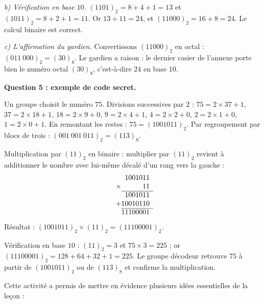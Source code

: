 \documentclass[11pt]{article}
\newcounter{popsec}
\newcounter{popsub}
\newcommand{\courssub}[1]{%
  \stepcounter{popsub}%
  \par\vspace{9pt}\noindent{\popxbold\fontsize{11.5}{13}\selectfont\color{popink}{\color{poporange}\thepopsec.\thepopsub}\hspace{6pt}#1}\par\nopagebreak\vspace{4pt}
}
\begin{document}
\begin{exoresolu}
\emph{b) Vérification en base $10$.} $(1101)_2 = 8 + 4 + 1 = 13$ et $(1011)_2 = 8 + 2 + 1 = 11$. Or $13 + 11 = 24$, et $(11000)_2 = 16 + 8 = 24$. Le calcul binaire est correct.

\emph{c) L'affirmation du gardien.} Convertissons $(11000)_2$ en octal : $(011\ 000)_2 = (30)_8$. Le gardien a raison : le dernier casier de l'annexe porte bien le numéro octal $(30)_8$, c'est-à-dire $24$ en base $10$.

\textbf{Question 5 : exemple de code secret.}

Un groupe choisit le numéro $75$. Divisions successives par $2$ :
$75 = 2 \times 37 + 1$,
$37 = 2 \times 18 + 1$,
$18 = 2 \times 9 + 0$,
$9 = 2 \times 4 + 1$,
$4 = 2 \times 2 + 0$,
$2 = 2 \times 1 + 0$,
$1 = 2 \times 0 + 1$.
En remontant les restes : $75 = (1001011)_2$.
Par regroupement par blocs de trois : $(001\ 001\ 011)_2 = (113)_8$.

Multiplication par $(11)_2$ en binaire : multiplier par $(11)_2$ revient à additionner le nombre avec lui-même décalé d'un rang vers la gauche :
\[
\begin{array}{r@{}c@{}c@{}c@{}c@{}c@{}c@{}c@{}c@{}c}
& & & 1 & 0 & 0 & 1 & 0 & 1 & 1 \\
\times & & & & & & & & 1 & 1 \\ \cline{2-10}
& & & 1 & 0 & 0 & 1 & 0 & 1 & 1 \\
+ & & 1 & 0 & 0 & 1 & 0 & 1 & 1 & 0 \\ \cline{2-10}
& & 1 & 1 & 1 & 0 & 0 & 0 & 0 & 1
\end{array}
\]
Résultat : $(1001011)_2 \times (11)_2 = (11100001)_2$.

Vérification en base $10$ : $(11)_2 = 3$ et $75 \times 3 = 225$ ; or $(11100001)_2 = 128 + 64 + 32 + 1 = 225$. Le groupe décodeur retrouve $75$ à partir de $(1001011)_2$ ou de $(113)_8$ et confirme la multiplication.
\end{exoresolu}

\courssub{Bilan de l'activité}

Cette activité a permis de mettre en évidence plusieurs idées essentielles de la leçon :
\end{document}
